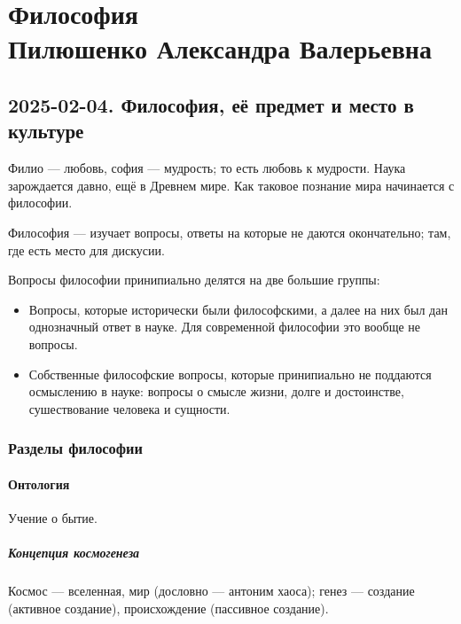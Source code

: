 \part[Философия]{
Философия \\
{\Large Пилюшенко Александра Валерьевна}
}

\chapter{2025-02-04. Философия, её предмет и место в культуре}

\begin{definition}[Философия]
	Филио --- любовь, софия --- мудрость; то есть любовь к мудрости. Наука
	зарождается давно, ещё в Древнем мире. Как таковое познание мира начинается с
	философии.

	Философия --- изучает вопросы, ответы на которые не даются окончательно; там,
	где есть место для дискусии.
\end{definition}

Вопросы философии принипиально делятся на две большие группы:
\begin{itemize}
	\item Вопросы, которые исторически были философскими, а далее на них был дан
	      однозначный ответ в науке. Для современной философии это вообще не вопросы.
	\item Собственные философские вопросы, которые принипиально не поддаются
	      осмыслению в науке: вопросы о смысле жизни, долге и достоинстве,
	      сушествование человека и сущности.
\end{itemize}

\section{Разделы философии}

\subsection{Онтология}

\begin{definition}[Онтология]
	Учение о бытие.
\end{definition}

\subsubsection{Концепция космогенеза}

\begin{definition}[Космогенез]
	Космос --- вселенная, мир (дословно --- антоним хаоса); генез --- создание
	(активное создание), происхождение (пассивное создание).
\end{definition}

